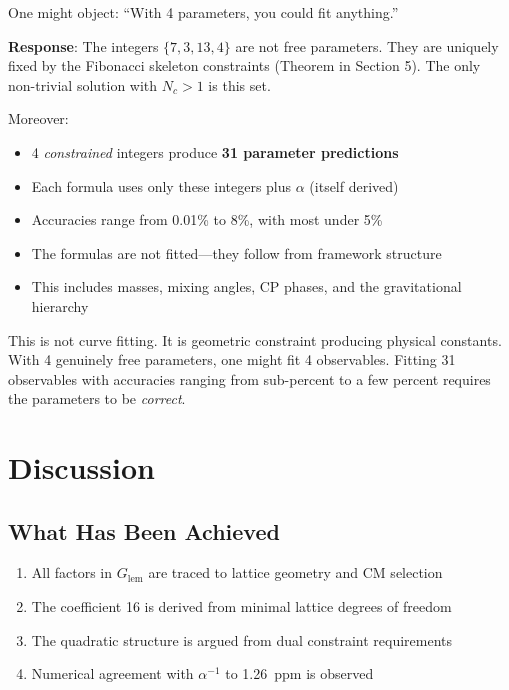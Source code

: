 \documentclass[11pt,a4paper]{article}
\theoremstyle{definition}
\theoremstyle{remark}
\newcommand{\Glem}{G_{\text{lem}}}
\begin{document}
One might object: ``With 4 parameters, you could fit anything.''

\textbf{Response}: The integers $\{7, 3, 13, 4\}$ are not free parameters. They are uniquely fixed by the Fibonacci skeleton constraints (Theorem in Section 5). The only non-trivial solution with $N_c > 1$ is this set.

Moreover:
\begin{itemize}
    \item 4 \emph{constrained} integers produce \textbf{31 parameter predictions}
    \item Each formula uses only these integers plus $\alpha$ (itself derived)
    \item Accuracies range from 0.01\% to 8\%, with most under 5\%
    \item The formulas are not fitted---they follow from framework structure
    \item This includes masses, mixing angles, CP phases, and the gravitational hierarchy
\end{itemize}

This is not curve fitting. It is geometric constraint producing physical constants. With 4 genuinely free parameters, one might fit 4 observables. Fitting 31 observables with accuracies ranging from sub-percent to a few percent requires the parameters to be \emph{correct}.

\section{Discussion}

\subsection{What Has Been Achieved}

\begin{enumerate}
    \item All factors in $\Glem$ are traced to lattice geometry and CM selection
    \item The coefficient 16 is derived from minimal lattice degrees of freedom
    \item The quadratic structure is argued from dual constraint requirements
    \item Numerical agreement with $\alpha^{-1}$ to 1.26~ppm is observed
\end{enumerate}
\end{document}
